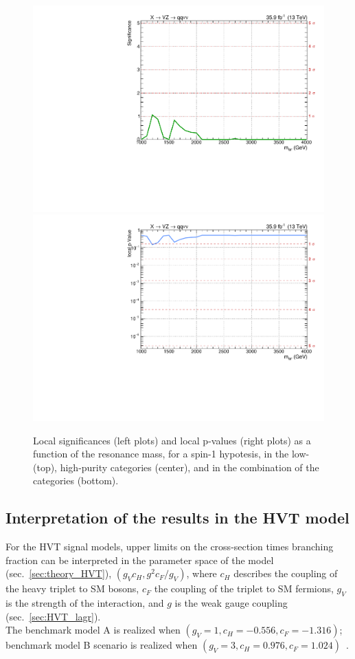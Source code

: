 \begin{figure}[!htb]
\begin{center}
     \includegraphics[width=.495\textwidth]{plotsAlpha_tesi/Limits/Significance_XWZInv_XVZnn.pdf}%
     \includegraphics[width=.495\textwidth]{plotsAlpha_tesi/Limits/pValue_XWZInv_XVZnn.pdf}
  \end{center}
  \caption{Local significances (left plots) and local p-values (right plots) as a function of the resonance mass, for a spin-1 \Wp hypotesis, in the low- (top), high-purity categories (center), and in the combination of the categories (bottom).}
  \label{fig:Signif_XWZInv}
\end{figure}


\clearpage 

\subsection{Interpretation of the results in the HVT model}

For the HVT signal models, upper limits on the cross-section times branching fraction can be interpreted in the parameter space of the model (sec.~\ref{sec:theory_HVT}), $\left( g_V c_H, g^2 c_F /g_V \right)$, where $c_H$ describes the coupling of the heavy triplet to SM bosons, $c_F$ the coupling of the triplet to SM fermions, $g_V$ is the strength of the interaction, and $g$ is the weak gauge coupling (sec.~\ref{sec:HVT_lagr}).\\
The benchmark model A is realized when $\left( g_V = 1, c_H = -0.556, c_F = -1.316 \right)$; benchmark model B scenario is realized when $\left( g_V = 3, c_H = 0.976, c_F = 1.024 \right)$~\cite{Pappadopulo2014}.

